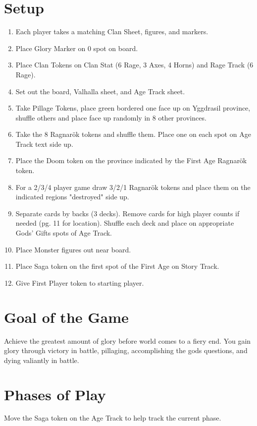 \documentclass[12pt]{article}
\newenvironment{enumerateCustom}
{\begin{enumerate}
  \setlength{\itemsep}{1pt}
  \setlength{\parskip}{0pt}
  \setlength{\parsep}{0pt}}
{\end{enumerate}}
\begin{document}
\begin{multicols*}{2}

\section*{Setup}
\begin{enumerateCustom}
    \item Each player takes a matching Clan Sheet, figures, and markers.
    \item Place Glory Marker on 0 spot on board.
    \item Place Clan Tokens on Clan Stat (6 Rage, 3 Axes, 4 Horns) and Rage Track (6 Rage).
    \item Set out the board, Valhalla sheet, and Age Track sheet.
    \item Take Pillage Tokens, place green bordered one face up on Yggdrasil province, shuffle others and place face up randomly in 8 other provinces.
    \item Take the 8 Ragnar\"ok tokens and shuffle them. Place one on each spot on Age Track text side up.
    \item Place the Doom token on the province indicated by the First Age Ragnar\"ok token.
    \item For a 2/3/4 player game draw 3/2/1 Ragnar\"ok tokens and place them on the indicated regions "destroyed" side up.
    \item Separate cards by backs (3 decks). Remove cards for high player counts if needed (pg. 11 for location). Shuffle each deck and place on appropriate Gods' Gifts spots of Age Track.
    \item Place Monster figures out near board.
    \item Place Saga token on the first spot of the First Age on Story Track.
    \item Give First Player token to starting player.
\end{enumerateCustom}

\section*{Goal of the Game}
Achieve the greatest amount of glory before world comes to a fiery end. You gain glory through victory in battle, pillaging, accomplishing the gods questions, and dying valiantly in battle.

\section*{Phases of Play}
Move the Saga token on the Age Track to help track the current phase.


\end{multicols*}
\end{document}
